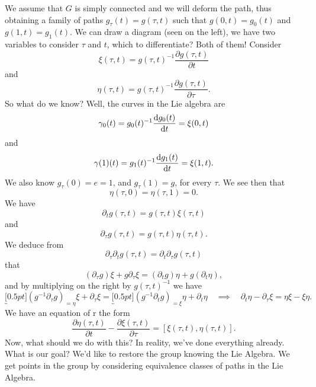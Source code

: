 \noindent\ignorespaces{}We assume that $G$ is simply connected
and we will deform the path, thus obtaining a family of paths
$g_{\tau}(t)=g(\tau,t)$ such that $g(0,t)=g_{0}(t)$ and
$g(1,t)=g_{1}(t)$. We can draw a diagram (seen on the left), we
have two variables to consider $\tau$ and $t$, which to
differentiate?  Both of them! Consider
\begin{equation}
\xi(\tau,t)=g(\tau,t)^{-1}\frac{\partial g(\tau,t)}{\partial t}
\end{equation}
and
\begin{equation}
\eta(\tau,t)=g(\tau,t)^{-1}\frac{\partial g(\tau,t)}{\partial\tau}.
\end{equation}
So what do we know? Well, the curves in the Lie algebra are
\begin{equation}
\gamma_{0}(t) = g_{0}(t)^{-1}\frac{\mathrm{d} g_{0}(t)}{\mathrm{d} t}=\xi(0,t)
\end{equation}
and
\begin{equation}
\gamma(1)(t) = g_{1}(t)^{-1}\frac{\mathrm{d} g_{1}(t)}{\mathrm{d} t}=\xi(1,t).
\end{equation}
We also know $g_{\tau}(0)=e=1$, and $g_{\tau}(1)=g$, for every
$\tau$. We see then that
\begin{equation}
\eta(\tau,0)=\eta(\tau,1)=0.
\end{equation}
We have
\begin{equation}
\partial_{t}g(\tau,t)=g(\tau,t)\xi(\tau,t)
\end{equation}
and
\begin{equation}
\partial_{\tau}g(\tau,t)=g(\tau,t)\eta(\tau,t).
\end{equation}
We deduce from
\begin{equation}
\partial_{\tau}\partial_{t}g(\tau,t)=\partial_{t}\partial_{\tau}g(\tau,t)
\end{equation}
that
\begin{equation}
(\partial_{\tau}g)\xi+g\partial_{\tau}\xi=(\partial_{t}g)\eta+g(\partial_{t}\eta),
\end{equation}
and by multiplying on the right by $g(\tau,t)^{-1}$ we have
\begin{equation}
\underbracket[0.5pt]{(g^{-1}\partial_{\tau}g)}_{=\eta}\xi+\partial_{\tau}\xi=\underbracket[0.5pt]{(g^{-1}\partial_{t}g)}_{=\xi}\eta+\partial_{t}\eta\quad\implies\quad
\partial_{t}\eta-\partial_{\tau}\xi=\eta\xi-\xi\eta.
\end{equation}
We have an equation of r the form
\begin{equation}
\frac{\partial\eta(\tau,t)}{\partial t}-\frac{\partial\xi(\tau,t)}{\partial\tau}
=[\xi(\tau,t),\eta(\tau,t)].
\end{equation}
Now, what should we do with this? In reality, we've done
everything already. What is our goal? We'd like to restore the
group knowing the Lie Algebra. We get points in the group by
considering equivalence classes of paths in the Lie Algebra.

